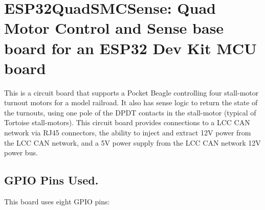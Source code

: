 %
%
%
%
% 
%
%
%
%
%
% 
%

\chapter{ESP32QuadSMCSense: Quad Motor Control and Sense base board for an ESP32 Dev Kit MCU board}

This is a circuit board that supports a Pocket Beagle controlling four 
stall-motor turnout motors for a model railroad. It also has sense logic to 
return the state of the turnouts, using one pole of the DPDT contacts in the 
stall-motor (typical of Tortoise stall-motors). This circuit board provides 
connections to a LCC CAN network via RJ45 connectors, the ability to inject 
and extract 12V power from the LCC CAN network, and a 5V power supply from the 
LCC CAN network 12V power bus.

\section{GPIO Pins Used.}

This board uses eight GPIO pins:


